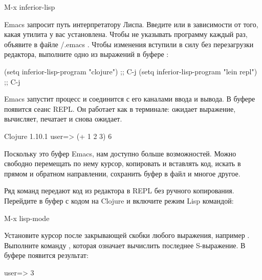 \begin{english}
  \begin{text}
M-x inferior-lisp
  \end{text}
\end{english}

Emacs запросит путь интерпретатору Лиспа. Введите  или  в зависимости от того, какая утилита у вас установлена. Чтобы не указывать программу каждый раз, объявите в файле \tilde{}/.emacs . Чтобы изменения вступили в силу без перезагрузки редактора, выполните одно из выражений в буфере :

\begin{english}
  \begin{lisp}
(setq inferior-lisp-program "clojure") ;; C-j
(setq inferior-lisp-program "lein repl") ;; C-j
  \end{lisp}
\end{english}

Emacs запустит процесс и соединится с его каналами ввода и вывода. В буфере  появится сеанс REPL. Он работает как в терминале: ожидает выражение, вычисляет, печатает и снова ожидает.

\begin{english}
  \begin{clojure}
Clojure 1.10.1
user=> (+ 1 2 3)
6
  \end{clojure}
\end{english}

Поскольку это буфер Emacs, нам доступно больше возможностей. Можно свободно перемещать по нему курсор, копировать и вставлять код, искать в прямом и обратном направлении, сохранить буфер в файл и многое другое.

Ряд команд передают код из редактора в REPL без ручного копирования. Перейдите в буфер с кодом на Clojure и включите режим Lisp командой:

\begin{english}
  \begin{text}
M-x lisp-mode
  \end{text}
\end{english}

Установите курсор после закрывающей скобки любого выражения, например . Выполните команду , которая означает вычислить последнее S-выражение. В буфере  появится результат:

\begin{english}
  \begin{text}
user=> 3
  \end{text}
\end{english}

